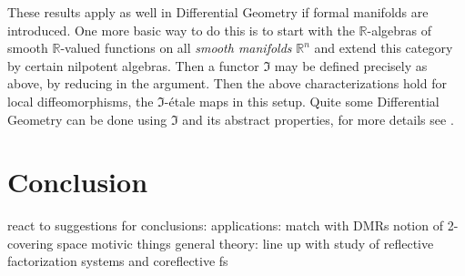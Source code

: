 \documentclass[9pt,twosided]{amsart}
\newcommand{\bR}{\mathbb R}
\newcommand{\todo}[1]{{\color{red}#1}}
\begin{document}
These results apply as well in Differential Geometry if formal manifolds are introduced.
One more basic way to do this is to start with the $\bR$-algebras of smooth $\bR$-valued functions on all \emph{smooth manifolds} $\bR^n$ and extend this category by certain nilpotent algebras.
Then a functor $\Im$ may be defined precisely as above, by reducing in the argument.
Then the above characterizations hold for local diffeomorphisms, the $\Im$-étale maps in this setup.
Quite some Differential Geometry can be done using $\Im$ and its abstract properties, for more details see \cite{SyntheticPDEs}.

\section{Conclusion}
\todo{react to suggestions for conclusions:}
applications: match with DMRs notion of 2-covering space
motivic things
general theory: line up with study of reflective factorization systems and coreflective fs

\printbibliography
\end{document}
